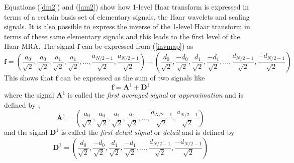 \documentclass[a4paper,11pt]{report}
\begin{document}
Equations (\ref{dm2}) and (\ref{am2}) show how 1-level Haar transform is expressed in terms of a certain basis set of elementary signals, the Haar wavelets and scaling signals. It is also possible to express the inverse of the 1-level Haar transform in terms of these same elementary signals and this leads to the first level of the Haar MRA. The signal $\mathbf{f}$ can be expressed from (\ref{invmap}) as
\begin{displaymath}
\mathbf{f} = \left( \frac{a_{0}}{\sqrt{2}},\frac{a_{0}}{\sqrt{2}},\frac{a_{1}}{\sqrt{2}},\frac{a_{1}}{\sqrt{2}},\ldots,\frac{a_{N/2-1}}{\sqrt{2}},\frac{a_{N/2-1}}{\sqrt{2}} \right) + 
	\left( \frac{d_{0}}{\sqrt{2}},\frac{-d_{0}}{\sqrt{2}},\frac{d_{1}}{\sqrt{2}},\frac{-d_{1}}{\sqrt{2}},\ldots,\frac{d_{N/2-1}}{\sqrt{2}},\frac{-d_{N/2-1}}{\sqrt{2}} \right)
\end{displaymath}
This shows that $\mathbf{f}$ can be expressed as the sum of two signals like 
\begin{equation}
\mathbf{f}=\mathbf{A}^{1}+\mathbf{D}^{1}
\end{equation}
where the signal $\mathbf{A}^{1}$ is called the \emph{first averaged signal} \cite{walker} or \emph{approximation} and is defined by \cite{walker},\cite{nric}
\begin{equation}
\mathbf{A}^{1} = \left( \frac{a_{0}}{\sqrt{2}},\frac{a_{0}}{\sqrt{2}},\frac{a_{1}}{\sqrt{2}},\frac{a_{1}}{\sqrt{2}},\ldots,\frac{a_{N/2-1}}{\sqrt{2}},\frac{a_{N/2-1}}{\sqrt{2}} \right) 
\end{equation}
and the signal $\mathbf{D}^{1}$ is called the \emph{first detail signal} \cite{walker} or \emph{detail} and is defined by
\begin{equation}
\mathbf{D}^{1} = \left( \frac{d_{0}}{\sqrt{2}},\frac{-d_{0}}{\sqrt{2}},\frac{d_{1}}{\sqrt{2}},\frac{-d_{1}}{\sqrt{2}},\ldots,\frac{d_{N/2-1}}{\sqrt{2}},\frac{-d_{N/2-1}}{\sqrt{2}} \right) 
\end{equation}
\end{document}
